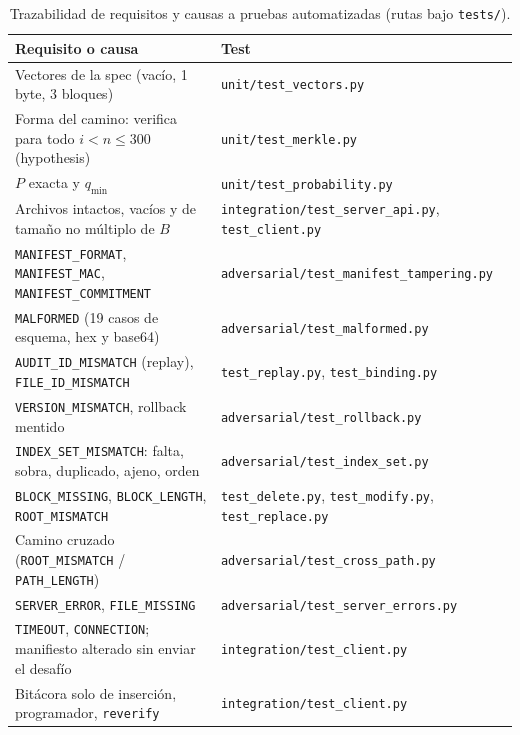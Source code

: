 \documentclass[11pt,a4paper]{article}
\newcommand{\code}[1]{\texttt{#1}}
\newcommand{\cause}[1]{\texttt{\small #1}}
\begin{document}
\begin{table}[ht]
\centering\small
\begin{tabularx}{\linewidth}{@{}>{\raggedright\arraybackslash}X>{\raggedright\arraybackslash}X@{}}
\toprule
Requisito o causa & Test \\
\midrule
Vectores de la spec (vacío, 1 byte, 3 bloques) & \code{unit/test\_vectors.py} \\
Forma del camino: verifica para todo $i<n\le 300$ (hypothesis) & \code{unit/test\_merkle.py} \\
$P$ exacta y $q_{\min}$ & \code{unit/test\_probability.py} \\
Archivos intactos, vacíos y de tamaño no múltiplo de $B$ & \code{integration/test\_server\_api.py}, \code{test\_client.py} \\
\cause{MANIFEST\_FORMAT}, \cause{MANIFEST\_MAC}, \cause{MANIFEST\_COMMITMENT} & \code{adversarial/test\_manifest\_tampering.py} \\
\cause{MALFORMED} (19 casos de esquema, hex y base64) & \code{adversarial/test\_malformed.py} \\
\cause{AUDIT\_ID\_MISMATCH} (replay), \cause{FILE\_ID\_MISMATCH} & \code{test\_replay.py}, \code{test\_binding.py} \\
\cause{VERSION\_MISMATCH}, rollback mentido & \code{adversarial/test\_rollback.py} \\
\cause{INDEX\_SET\_MISMATCH}: falta, sobra, duplicado, ajeno, orden & \code{adversarial/test\_index\_set.py} \\
\cause{BLOCK\_MISSING}, \cause{BLOCK\_LENGTH}, \cause{ROOT\_MISMATCH} & \code{test\_delete.py}, \code{test\_modify.py}, \code{test\_replace.py} \\
Camino cruzado (\cause{ROOT\_MISMATCH} / \cause{PATH\_LENGTH}) & \code{adversarial/test\_cross\_path.py} \\
\cause{SERVER\_ERROR}, \cause{FILE\_MISSING} & \code{adversarial/test\_server\_errors.py} \\
\cause{TIMEOUT}, \cause{CONNECTION}; manifiesto alterado sin enviar el desafío & \code{integration/test\_client.py} \\
Bitácora solo de inserción, programador, \code{reverify} & \code{integration/test\_client.py} \\
\bottomrule
\end{tabularx}
\caption{Trazabilidad de requisitos y causas a pruebas automatizadas (rutas bajo \code{tests/}).}
\label{tab:pruebas}
\end{table}
\end{document}
